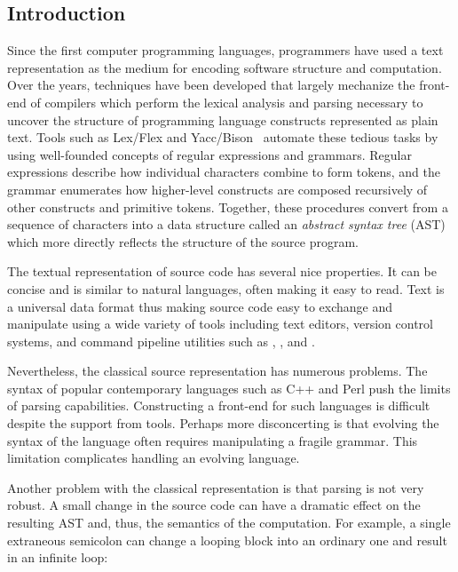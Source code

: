 \documentclass{article}
\begin{document}
\begin{multicols}{2}

\section{Introduction}
\label{sec-intro}

Since the first computer programming languages, programmers have used a
text representation as the medium for encoding software structure and
computation.  Over the years, techniques have been developed that
largely mechanize the front-end of compilers which perform the lexical
analysis and parsing necessary to uncover the structure of programming
language constructs represented as plain text.  Tools such as Lex/Flex
and Yacc/Bison~\cite{Levine92} automate these tedious tasks by using
well-founded concepts of regular expressions and grammars. Regular
expressions describe how individual characters combine to form tokens,
and the grammar enumerates how higher-level constructs are composed
recursively of other constructs and primitive tokens.  Together, these
procedures convert from a sequence of characters into a data structure
called an \emph{abstract syntax tree} (AST) which more directly reflects
the structure of the source program.

The textual representation of source code has several nice properties.
It can be concise and is similar to natural languages, often making it
easy to read.  Text is a universal data format thus making source code
easy to exchange and manipulate using a wide variety of tools including
text editors, version control systems, and command pipeline utilities
such as , , and .

Nevertheless, the classical source representation has numerous problems.
The syntax of popular contemporary languages such as C++ and Perl push
the limits of parsing capabilities.  Constructing a front-end for such
languages is difficult despite the support from tools.  Perhaps more
disconcerting is that evolving the syntax of the language often requires
manipulating a fragile grammar.  This limitation complicates handling an
evolving language.

Another problem with the classical representation is that parsing is not
very robust.  A small change in the source code can have a dramatic
effect on the resulting AST and, thus, the semantics of the computation.
For example, a single extraneous semicolon can change a looping block
into an ordinary one and result in an infinite loop:


\end{multicols}
\end{document}
